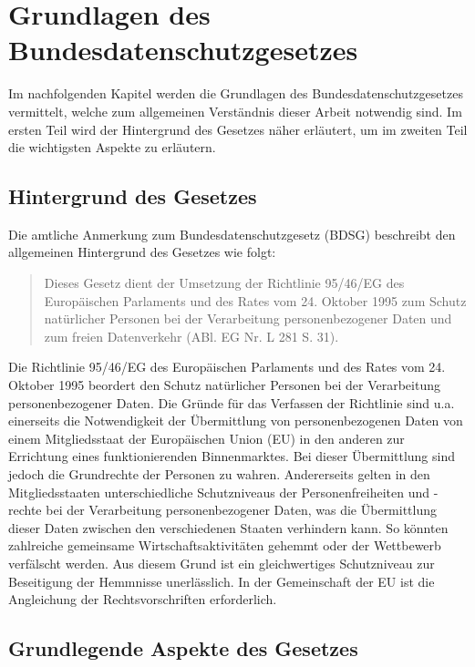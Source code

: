 \chapter{Grundlagen des Bundesdatenschutzgesetzes}
Im nachfolgenden Kapitel werden die Grundlagen des Bundesdatenschutzgesetzes vermittelt, welche zum allgemeinen Verständnis dieser Arbeit notwendig sind. Im ersten Teil wird der Hintergrund des Gesetzes näher erläutert, um im zweiten Teil die wichtigsten Aspekte zu erläutern.
\section{Hintergrund des Gesetzes}
Die amtliche Anmerkung zum Bundesdatenschutzgesetz (\acs{BDSG}) beschreibt den allgemeinen Hintergrund des Gesetzes wie folgt:
\begin{quote}
\glqq Dieses Gesetz dient der Umsetzung der Richtlinie 95/46/EG des Europäischen Parlaments und des Rates vom 24. Oktober 1995 zum Schutz natürlicher Personen bei der Verarbeitung personenbezogener Daten und zum freien Datenverkehr (ABl. EG Nr. L 281 S. 31).\grqq \autocite[][]{DeJureBDSG}
\end{quote}
Die Richtlinie 95/46/EG des Europäischen Parlaments und des Rates vom 24. Oktober 1995 beordert den Schutz natürlicher Personen bei der Verarbeitung personenbezogener Daten. Die Gründe für das Verfassen der Richtlinie sind u.a. einerseits die Notwendigkeit der Übermittlung von personenbezogenen Daten von einem Mitgliedsstaat der Europäischen Union (\acs{EU}) in den anderen zur Errichtung eines funktionierenden Binnenmarktes. Bei dieser Übermittlung sind jedoch die Grundrechte der Personen zu wahren. Andererseits gelten in den Mitgliedsstaaten unterschiedliche Schutzniveaus der Personenfreiheiten und -rechte bei der Verarbeitung personenbezogener Daten, was die Übermittlung dieser Daten zwischen den verschiedenen Staaten verhindern kann. So könnten zahlreiche gemeinsame Wirtschaftsaktivitäten gehemmt oder der Wettbewerb verfälscht werden. Aus diesem Grund ist ein gleichwertiges Schutzniveau zur Beseitigung der Hemmnisse unerlässlich. In der Gemeinschaft der EU ist die Angleichung der Rechtsvorschriften erforderlich.\autocite[vgl.][]{EU.1995}\\
\section{Grundlegende Aspekte des Gesetzes}
